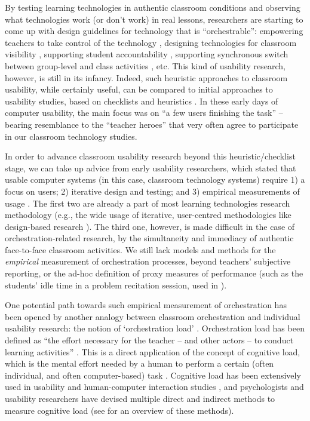 \documentclass[10pt,journal,compsoc]{IEEEtran}
\begin{document}
By testing learning technologies in authentic classroom conditions and observing what technologies work (or don't work) in real lessons, researchers are starting to come up with design guidelines for technology that is ``orchestrable'': empowering teachers to take control of the technology \cite{Cuendet2013}, designing technologies for classroom visibility \cite{Dillenbourg2013}, supporting student accountability \cite{Kharrufa2013}, supporting synchronous switch between group-level and class activities \cite{Kreitmayer2013}, etc. This kind of usability research, however, is still in its infancy. Indeed, such heuristic approaches to classroom usability, while certainly useful, can be compared to initial approaches to usability studies, based on checklists \cite{ravden1989evaluating} and heuristics \cite{nielsen1992finding}. In these early days of computer usability, the main focus was on ``a few users finishing the task'' \cite{Webusability} -- bearing resemblance to the ``teacher heroes'' \cite{Dillenbourg2009b} that very often agree to participate in our classroom technology studies. 

In order to advance classroom usability research beyond this heuristic/checklist stage, we can take up advice from early usability researchers, which stated that usable computer systems (in this case, classroom technology systems) require 1) a focus on users; 2) iterative design and testing; and 3) empirical measurements of usage \cite{Gould1985}. The first two are already a part of most learning technologies research methodology (e.g., the wide usage of iterative, user-centred methodologies like design-based research \cite{wang2005design}). The third one, however, is made difficult in the case of orchestration-related research, by the simultaneity and immediacy of authentic face-to-face classroom activities. We still lack models and methods for the \textit{empirical} measurement of orchestration processes, beyond teachers' subjective reporting, or the ad-hoc definition of proxy measures of performance (such as the students' idle time in a problem recitation session, used in \cite{Alavi2012}).

One potential path towards such empirical measurement of orchestration has been opened by another analogy between classroom orchestration and individual usability research: the notion of `orchestration load' \cite{Dillenbourg2013}. Orchestration load has been defined as ``the effort necessary for the teacher -- and other actors -- to conduct learning activities'' \cite{Cuendet2013}. This is a direct application of the concept of cognitive load, which is the mental effort needed by a human to perform a certain (often individual, and often computer-based) task \cite{Paas2004}. Cognitive load has been extensively used in usability and human-computer interaction studies \cite{oviatt2004we}, and psychologists and usability researchers have devised multiple direct and indirect methods to measure cognitive load (see \cite{Brunken2003} for an overview of these methods). 
\end{document}
